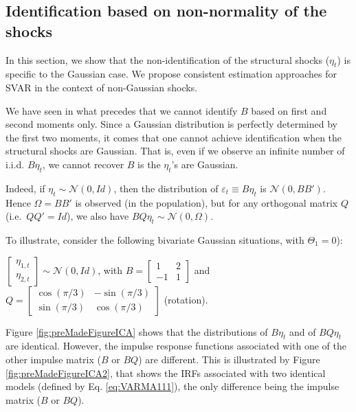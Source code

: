 \documentclass[
  12pt,
]{book}
\theoremstyle{definition}
\theoremstyle{definition}
\theoremstyle{definition}
\theoremstyle{definition}
\theoremstyle{remark}
\begin{document}
\hypertarget{NonGaussian}{%
\subsection{Identification based on non-normality of the shocks}\label{NonGaussian}}

In this section, we show that the non-identification of the structural shocks (\(\eta_t\)) is specific to the Gaussian case. We propose consistent estimation approaches for SVAR in the context of non-Gaussian shocks.

We have seen in what precedes that we cannot identify \(B\) based on first and second moments only. Since a Gaussian distribution is perfectly determined by the first two moments, it comes that one cannot achieve identification when the structural shocks are Gaussian. That is, even if we observe an infinite number of i.i.d. \(B \eta_t\), we cannot recover \(B\) is the \(\eta_t\)'s are Gaussian.

Indeed, if \(\eta_t \sim \mathcal{N}(0,Id)\), then the distribution of \(\varepsilon_t \equiv B \eta_t\) is \(\mathcal{N}(0,BB')\). Hence \(\Omega = B B'\) is observed (in the population), but for any orthogonal matrix \(Q\) (i.e.~\(QQ'=Id\)), we also have \(BQ \eta_t \sim \mathcal{N}(0,\Omega)\).

To illustrate, consider the following bivariate Gaussian situations, with \(\Theta_1=0\)):

\(\left[\begin{array}{c}\eta_{1,t}\\ \eta_{2,t}\end{array}\right]\sim \mathcal{N}(0,Id)\), with
\(B = \left[\begin{array}{cc} 1 & 2 \\ -1 & 1 \end{array}\right]\) and
\(Q = \left[\begin{array}{cc} \cos(\pi/3) & -\sin(\pi/3) \\ \sin(\pi/3) & \cos(\pi/3) \end{array}\right]\) (rotation).

Figure \ref{fig:preMadeFigureICA} shows that the distributions of \(B \eta_t\) and of \(BQ\eta_t\) are identical. However, the impulse response functions associated with one of the other impulse matrix (\(B\) or \(BQ\)) are different. This is illustrated by Figure \ref{fig:preMadeFigureICA2}, that shows the IRFs associated with two identical models (defined by Eq. \eqref{eq:VARMA111}), the only difference being the impulse matrix (\(B\) or \(BQ\)).
\end{document}
